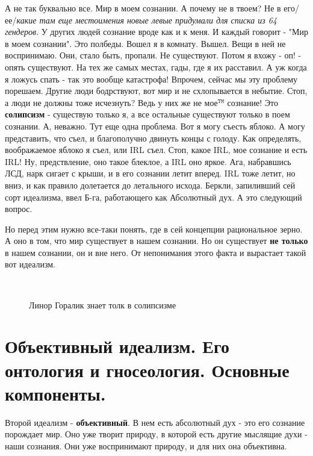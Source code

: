 А не так буквально все. Мир в моем сознании. А почему не в твоем? Не в его/ее/\textit{какие там еще местоимения новые левые придумали для списка из 64 гендеров}. У других людей сознание вроде как и к меня. И каждый говорит - "Мир в моем сознании". Это полбеды. Вошел я в комнату. Вышел. Вещи в ней не воспринимаю. Они, стало быть, пропали. Не существуют. Потом я вхожу - оп! - опять существуют. На тех же самых местах, гады, где я их расставил. А уж когда я ложусь спать - так это вообще катастрофа! Впрочем, сейчас мы эту проблему порешаем. Другие люди бодрствуют, вот мир и не схлопывается в небытие. Стоп, а люди не должны тоже исчезнуть? Ведь у них же не мое${}^\mathtt{TM}$ сознание! Это \textbf{солипсизм} - существую только я, а все остальные существуют только в поем сознании. А, неважно. Тут еще одна проблема. Вот я могу съесть яблоко. А могу представить, что съел, и благополучно двинуть концы с голоду. Как определять, воображаемое яблоко я съел, или IRL съел. Стоп, какое IRL, мое сознание и есть IRL! Ну, предствление, оно такое блеклое, а IRL оно яркое. Ага, набравшись ЛСД, нарк сигает с крыши, и в его сознании летит вперед. IRL тоже летит, но вниз, и как правило долетается до летального исхода. Беркли, запиливший сей сорт идеализма, ввел Б-га, работающего как Абсолютный дух. А это следующий вопрос.

 Но перед этим нужно все-таки понять, где в сей концепции рациональное зерно. А оно в том, что мир существует в нашем сознании. Но он существует \textbf{не только} в нашем сознании, он и вне него. От непонимания этого факта и вырастает такой вот идеализм.

\begin{figure}[h]
\\
\caption{Линор Горалик знает толк в солипсизме}
\end{figure}

\section{ Объективный идеализм. Его онтология и гносеология. Основные компоненты.}
Второй идеализм - \textbf{объективный}. В нем есть абсолютный дух - это его сознание порождает мир. Оно уже творит природу, в которой есть другие мыслящие духи - наши сознания. Они уже воспринимают природу, и для них она объективна.

